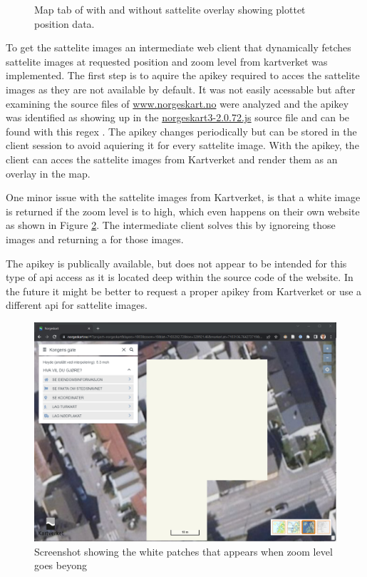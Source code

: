 \begin{figure}[H]
    \caption{Map tab of \srgui with and without sattelite overlay showing plottet position data.}
    \label{fig:gui_map}
\end{figure}

To get the sattelite images an intermediate web client that dynamically fetches sattelite images at requested position and zoom level from kartverket was implemented.
The first step is to aquire the \gls{apikey} required to acces the sattelite images as they are not available by default.
It was not easily acessable but after examining the source files of \href{https://www.norgeskart.no}{www.norgeskart.no} were analyzed and the \gls{apikey} was identified as showing up in the \href{https://www.norgeskart.no/norgeskart3-2.0.72.js}{norgeskart3-2.0.72.js} source file and can be found with this regex .
The \gls{apikey} changes periodically but can be stored in the client session to avoid aquiering it for every sattelite image.
With the \gls{apikey}, the client can acces the sattelite images from Kartverket and render them as an overlay in the map.

One minor issue with the sattelite images from Kartverket, is that a white image is returned if the zoom level is to high, which even happens on their own website as shown in Figure \ref{fig:norgeskart_bug}.
The intermediate client solves this by ignoreing those images and returning a  for those images.

The \gls{apikey} is publically available, but does not appear to be intended for this type of \gls{api} access as it is located deep within the source code of the website.
In the future it might be better to request a proper \gls{apikey} from Kartverket or use a different \gls{api} for sattelite images.

\begin{figure}[H]
    \centering
    \includegraphics[width=.8\textwidth]{figures/gui/norgeskart_bug.png}
    \caption{Screenshot showing the white patches that appears when zoom level goes beyong \todo \cite{kartverketNorgeskart}}
    \label{fig:norgeskart_bug}
\end{figure}
